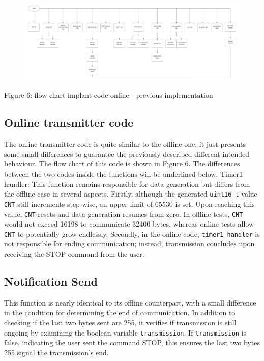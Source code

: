 \documentclass{Configuration_Files/PoliMi3i_thesis}
\begin{document}
\begin{figure}[H]
	\includegraphics[scale=0.3]{Previous Implementation/Screenshot 2024-08-15 at 11.01.21.png}
	\centering
\end{figure}

Figure 6: flow chart implant code online - previous implementation

\subsection{Online transmitter code}

The online transmitter code is quite similar to the offline one, it just presents some small differences to guarantee the previously described different intended behaviour. The flow chart of this code is shown in Figure 6. The differences between the two codes inside the functions will be underlined below. 
Timer1 handler: This function remains responsible for data generation but differs from the offline case in several aspects. Firstly, although the generated \texttt{uint16\_t} value \texttt{CNT} still increments step-wise, an upper limit of 65530 is set. Upon reaching this value, \texttt{CNT} resets and data generation resumes from zero. In offline tests, \texttt{CNT} would not exceed 16198 to communicate 32400 bytes, whereas online tests allow \texttt{CNT} to potentially grow endlessly. Secondly, in the online code, \texttt{timer1\_handler} is not responsible for ending communication; instead, transmission concludes upon receiving the STOP command from the user.

\subsection*{Notification Send}
This function is nearly identical to its offline counterpart, with a small difference in the condition for determining the end of communication. In addition to checking if the last two bytes sent are 255, it verifies if transmission is still ongoing by examining the boolean variable \texttt{transmission}. If \texttt{transmission} is false, indicating the user sent the command STOP, this ensures the last two bytes 255 signal the transmission's end.
\end{document}
